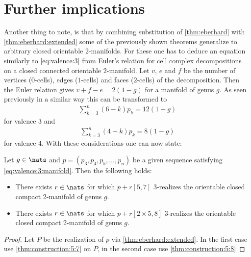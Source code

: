 \section{Further implications}

Another thing to note, is that by combining substitution of \autoref{thm:eberhard} with \autoref{thm:eberhard:extended} some of the previously shown theorems generalize to arbitrary closed orientable 2-manifolds. For these one has to deduce an equation similarly to  \autoref{eq:valence:3} from Euler's relation for cell complex decompositions on a closed connected orientable $2$-manifold. Let $v$, $e$ and $f$ be the number of vertices ($0$-cells), edges ($1$-cells) and faces ($2$-cells) of the decomposition. Then the Euler relation gives $v + f - e = 2(1-g)$ for a manifold of genus $g$. As seen previously in a similar way this can be transformed to
\begin{align}
  \sum_{k=3}^n \left(6 - k \right) p_k = 12(1-g) \label{eq:valence:3:manifold}
\end{align}
for valence $3$ and
\begin{align}
  \sum_{k=3}^n \left(4 - k \right) p_k = 8(1-g)  \label{eq:valence:4:manifold}
\end{align}
for valence $4$. With these considerations one can now state:
\begin{theorem}
  Let $g \in \nats$ and $p = (p_3, p_4, p_5, \dots, p_n)$ be a given sequence satisfying \autoref{eq:valence:3:manifold}. Then the following holds:
  \begin{itemize}
  \item There exists $r \in \nats$ for which $p + r [5, 7]$ $3$-realizes the orientable closed compact 2-manifold of genus $g$.
  \item There exists $r \in \nats$ for which $p + r [2 \times 5, 8]$ $3$-realizes the orientable closed compact 2-manifold of genus $g$.
  \end{itemize}
  \begin{proof}
    Let $P$ be the realization of $p$ via \autoref{thm:eberhard:extended}. In the first case use \autoref{thm:construction:5:7} on $P$, in the second case use \autoref{thm:construction:5:8}
  \end{proof}
\end{theorem}

